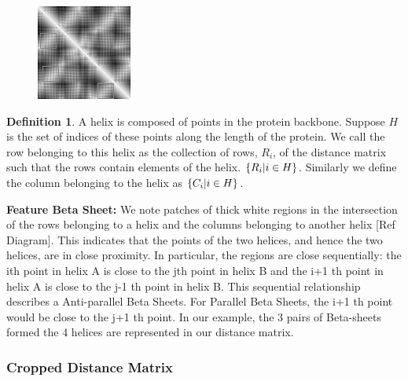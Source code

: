 \documentclass[12pt, a4paper, twocolumn, fullpage]{article}
\theoremstyle{plain}
\theoremstyle{definition}
\newtheorem{defn}{Definition}[section]
\theoremstyle{remark}
\begin{document}
	
\begin{figure}[h]
	\centering
	\includegraphics[width=.7\linewidth]{1ux8matBetaSheets}
	\caption{}
	\label{fig:network}
\end{figure}

\begin{defn}
A helix is composed of points in the protein backbone. Suppose $H$ is the set of indices of these points along the length of the protein. We call the row belonging to this helix as the collection of rows, $R_{i}$, of the distance matrix such that the rows contain elements of the helix. $\{R_{i} \space | \space i \in H \}$. Similarly we define the column belonging to the helix as $\{C_{i} \space | \space i \in H \}$.
\end{defn}

\noindent
\textbf{Feature Beta Sheet:}
We note patches of thick white regions in the intersection of the rows belonging to a helix and the columns belonging to another helix [Ref Diagram]. This indicates that the points of the two helices, and hence the two helices, are in close proximity. In particular, the regions are close sequentially: the ith point in helix A is close to the jth point in helix B and the i+1 th point in helix A is close to the j-1 th point in helix B. This sequential relationship describes a Anti-parallel Beta Sheets. For Parallel Beta Sheets, the i+1 th point would be close to the j+1 th point. In our example, the 3 pairs of Beta-sheets formed the 4 helices are represented in our distance matrix.
	
\subsubsection{ Cropped Distance Matrix}
\end{document}
